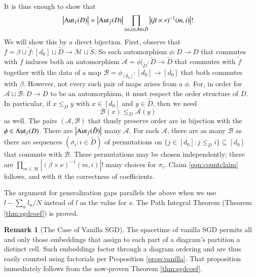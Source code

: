 \documentclass{article}
\theoremstyle{plain}
\theoremstyle{definition}
\newtheorem{rmk}{Remark}
\newcommand{\wabs}[1]{\left|#1\right|}
\newcommand{\Aut}{\text{\textnormal{Aut}}}
\newcommand{\Aa}{\mathcal{A}}
\newcommand{\Bb}{\mathcal{B}}
\newcommand{\Mm}{\mathcal{M}}
\begin{document}
            It is thus enough to show that
            \begin{align*} \label{eqn:countclaim}
                \wabs{\Aut_f(D)} = 
                \wabs{\Aut_{\tilde f}(D)}
                \prod_{(m, i) \in \Mm \times \tilde D}
                    \wabs{(\beta \times \nu)^{-1}(m, i)}!
            \end{align*}
            We will show this by a direct bijection.  First, observe that
            $
                f = \beta \sqcup \tilde f:
                    [d_0] \sqcup \tilde D \to \Mm \sqcup \tilde S
            $. 
            So each automorphism $\phi: D\to D$ that commutes with $f$ induces
            both an automorphism
            $
                \Aa = \phi|_{\tilde D}: \tilde D\to \tilde D
            $
            that commutes with $\tilde f$ together with the data of a map
            $
                \Bb = \phi_{[d_0]}: [d_0] \to [d_0] 
            $
            that both commutes with $\beta$.  However, not every such pair of
            maps arises from a $\phi$.  For, in order for $\Aa \sqcup \Bb: D
            \to D$ to be an automorphism, it must respect the order structure
            of $D$.  In particular, if $x\leq_D y$ with $x \in [d_0]$ and $y
            \in \tilde D$, then we need
            $$
                \Bb(x) \leq_D \Aa(y)
            $$
            as well.  The
            pairs $(\Aa, \Bb)$ that thusly preserve order are in bijection with
            the $\phi \in \Aut_f(D)$.  There are $\wabs{\Aut_{\tilde f}(\tilde
            D)}$ many $\Aa$.  For each $\Aa$, there are as many $\Bb$ as there
            are sequences $(\sigma_i: i \in \tilde D)$ of permutations on
            $
                \{j\in [d_0]: j\leq_D i\} \subseteq [d_0]
            $ 
            that commute with $\Bb$.  These permutations may be chosen
            independently; there are 
            $
                \prod_{m\in \Mm}
                    \wabs{(\beta \times \nu)^{-1}(m, i)}!
            $
            many choices for $\sigma_i$.  Claim \ref{eqn:countclaim} follows,
            and with it the correctness of coefficients.
 
            The argument for generalization gaps parallels the above when we
            use $l-\sum_n l_n/N$ instead of $l$ as the value for $s$.  The Path
            Integral Theorem (Theorem \ref{thm:sgdcoef}) is proved.

            \begin{rmk}[The Case of Vanilla SGD]
                The spacetime of vanilla SGD permits all and only those
                embeddings that assign to each part of a diagram's partition  a
                distinct cell.  Such embeddings factor through a diagram
                ordering and are thus easily counted using factorials per
                Proposition \ref{prop:vanilla}.  That proposition immediately
                follows from the now-proven Theorem \ref{thm:sgdcoef}.
            \end{rmk}
\end{document}
